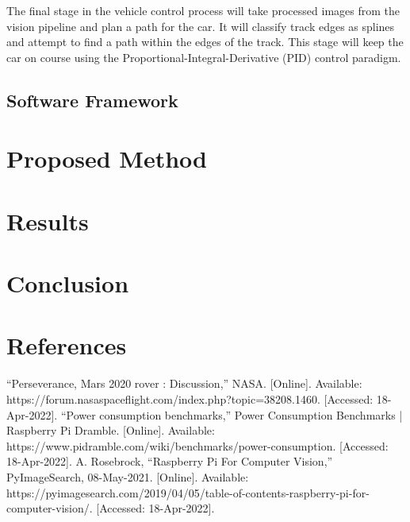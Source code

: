 \documentclass{article}
\begin{document}
The final stage in the vehicle control process will take processed images from the
vision pipeline and plan a path for the car. It will classify track edges as splines
and attempt to find a path within the edges of the track. This stage will keep the car
on course using the Proportional-Integral-Derivative (PID) control paradigm.

 

\subsection{Software Framework}



\section{Proposed Method}


\section{Results}
\section{Conclusion}
\section{References}

\begin{thebibliography}{00}
 “Perseverance, Mars 2020 rover : Discussion,” NASA. [Online]. Available: https://forum.nasaspaceflight.com/index.php?topic=38208.1460. [Accessed: 18-Apr-2022].
 “Power consumption benchmarks,” Power Consumption Benchmarks | Raspberry Pi Dramble. [Online]. Available: https://www.pidramble.com/wiki/benchmarks/power-consumption. [Accessed: 18-Apr-2022].
 A. Rosebrock, “Raspberry Pi For Computer Vision,” PyImageSearch, 08-May-2021. [Online]. Available: https://pyimagesearch.com/2019/04/05/table-of-contents-raspberry-pi-for-computer-vision/. [Accessed: 18-Apr-2022].
\end{thebibliography}
\end{document}
